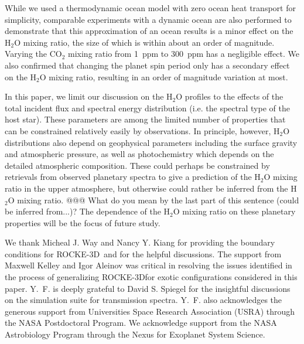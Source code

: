 \documentclass[11pt,numberedappendix,twocolappendix,]{emulateapj}
\def\water{H$_2$O }
\def\modelE{ROCKE-3D}
\newcommand{\dsa}[1]{{\color{blue}#1}}
\begin{document}
While we used a thermodynamic ocean model with zero ocean heat transport for simplicity, comparable experiments with a dynamic ocean are also performed to demonstrate that this approximation of an ocean results is a minor effect on the \water mixing ratio, the size of which is within about an order of magnitude. 
Varying the CO$_2$ mixing ratio from 1~ppm to 300~ppm has a negligible effect. 
We also confirmed that changing the planet spin period only has a secondary effect on the \water mixing ratio, resulting in an order of magnitude variation at most. 


In this paper, we limit our discussion on the \water profiles to the effects of the total incident flux and spectral energy distribution (i.e. the spectral type of the host star). 
These parameters are among the limited number of properties that can be constrained relatively easily by observations. 
In principle, however, \water distributions also depend on geophysical parameters including the surface gravity and atmospheric pressure, as well as photochemistry which depends on the detailed atmospheric composition. 
These could perhaps be constrained by retrievals from observed planetary spectra to give a prediction of the \water mixing ratio in the upper atmosphere, but otherwise could rather be inferred from the \water mixing ratio. \dsa{@@@ What do you mean by the last part of this sentence (could be inferred from...)?}
The dependence of the \water mixing ratio on these planetary properties will be  the focus of future study. 





\acknowledgments
We thank Micheal J. Way and Nancy Y. Kiang for providing the boundary conditions for \modelE \ and for the helpful discussions. 
The support from Maxwell Kelley and Igor Aleinov was critical in resolving the issues identified in the process of generalizing \modelE for exotic configurations considered in this paper. 
Y.~F. is deeply grateful to David S. Spiegel for the insightful discussions on the simulation suite for transmission spectra. 
Y.~F. also acknowledges the generous support from Universities Space Research Association (USRA) through the NASA Postdoctoral Program. 
We acknowledge support from the NASA Astrobiology Program through the Nexus for Exoplanet System Science.




\appendix


\end{document}
